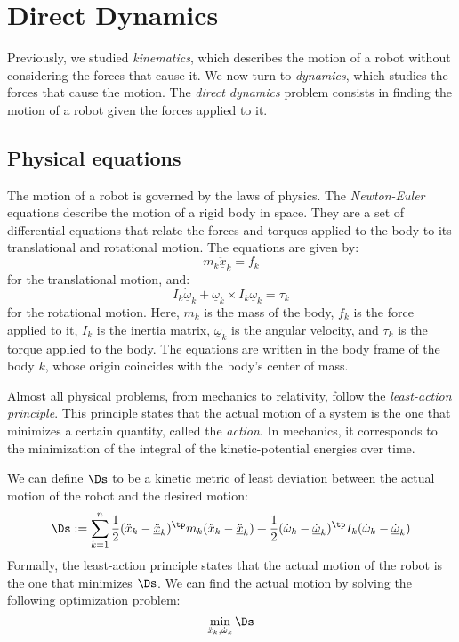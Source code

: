\section{Direct Dynamics}
Previously, we studied \emph{kinematics}, which describes the motion of a robot without considering the forces that cause it. We now turn to \emph{dynamics}, which studies the forces that cause the motion. The \emph{direct dynamics} problem consists in finding the motion of a robot given the forces applied to it.

\subsection{Physical equations}
The motion of a robot is governed by the laws of physics. The \emph{Newton-Euler} equations describe the motion of a rigid body in space. They are a set of differential equations that relate the forces and torques applied to the body to its translational and rotational motion. The equations are given by:
\begin{equation}
    \tag{Newton's equation}
    m_k\underline{\ddot{x}}_k = f_k
\end{equation}
for the translational motion, and:
\begin{equation}
    \tag{Euler's equation}
    I_k\underline{\dot{\omega}}_k + \underline{\omega}_k\times I_k\underline{\omega}_k = \tau_k
\end{equation}
for the rotational motion. Here, $m_k$ is the mass of the body, $f_k$ is the force applied to it, $I_k$ is the inertia matrix, $\underline{\omega}_k$ is the angular velocity, and $\tau_k$ is the torque applied to the body. The equations are written in the body frame of the body $k$, whose origin coincides with the body's center of mass.

Almost all physical problems, from mechanics to relativity, follow the \emph{least-action principle}. This principle states that the actual motion of a system is the one that minimizes a certain quantity, called the \emph{action}. In mechanics, it corresponds to the minimization of the integral of the kinetic-potential energies over time.

We can define $\Ds$ to be a kinetic metric of least deviation between the actual motion of the robot and the desired motion:
\begin{equation}
    \Ds := \sum_{k=1}^n \frac{1}{2}(\ddot{x}_k - \underline{\ddot{x}}_k)^\tp m_k (\ddot{x}_k - \underline{\ddot{x}}_k) + \frac{1}{2}(\dot{\omega}_k - \underline{\dot{\omega}}_k)^\tp I_k (\dot{\omega}_k - \underline{\dot{\omega}}_k)
\end{equation}
Formally, the least-action principle states that the actual motion of the robot is the one that minimizes $\Ds$. We can find the actual motion by solving the following optimization problem:
\begin{equation}
    \min_{\ddot{x}_k, \dot{\omega}_k} \Ds
\end{equation}

